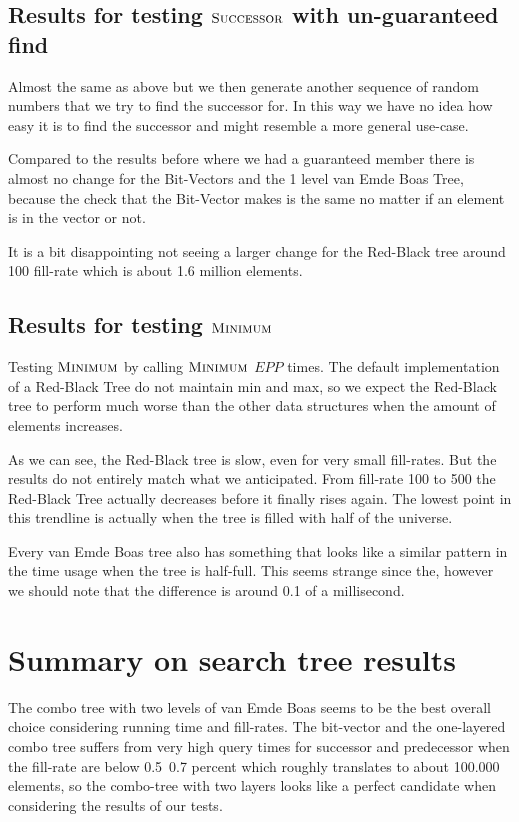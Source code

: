 \documentclass[oneside,11pt,openright]{report}
\newcommand{\Minimum}{\textsc{Minimum}}
\newcommand{\Successor}{\textsc{Successor}}
\begin{document}
\subsection{Results for testing $\Successor$ with un-guaranteed find}

Almost the same as above but we then generate another sequence of random numbers that we try to find the successor for. In this way we have no idea how easy it is to find the successor and might resemble a more general use-case.




Compared to the results before where we had a guaranteed member there is almost no change for the Bit-Vectors and the 1 level van Emde Boas Tree, because the check that the Bit-Vector makes is the same no matter if an element is in the vector or not. 

It is a bit disappointing not seeing a larger change for the Red-Black tree around 100 fill-rate which is about 1.6 million elements.

\subsection{Results for testing $\Minimum$}

Testing $\Minimum$ by calling $\Minimum$ $EPP$ times. The default implementation of a Red-Black Tree do not maintain min and max, so we expect the Red-Black tree to perform much worse than the other data structures when the amount of elements increases.



As we can see, the Red-Black tree is slow, even for very small fill-rates. But the results do not entirely match what we anticipated. From fill-rate 100 to 500 the Red-Black Tree actually decreases before it finally rises again. The lowest point in this trendline is actually when the tree is filled with half of the universe.

Every van Emde Boas tree also has something that looks like a similar pattern in the time usage when the tree is half-full. This seems strange since the, however we should note that the difference is around 0.1 of a millisecond.

\section{Summary on search tree results}

The combo tree with two levels of van Emde Boas seems to be the best overall choice considering running time and fill-rates. The bit-vector and the one-layered combo tree suffers from very high query times for successor and predecessor when the fill-rate are below 0.5~0.7 percent which roughly translates to about 100.000 elements, so the combo-tree with two layers looks like a perfect candidate when considering the results of our tests.
\end{document}
